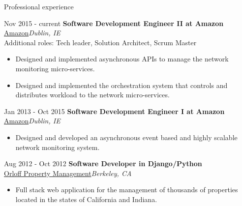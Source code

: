 \begin{cvlist}{Professional experience}
  \item[\footnotesize{Nov 2015 - current}] \textbf{Software Development Engineer II at Amazon}\\
  \href{http://www.amazon.com}{Amazon}\hfill\textit{Dublin, IE}\\
  Additional roles: Tech leader, Solution Architect, Scrum Master
  \begin{small}
    \begin{itemize}
      \item Designed and implemented asynchronous APIs to manage the network monitoring micro-services.
      \item Designed and implemented the orchestration system that controls and distributes workload to the network micro-services.
    \end{itemize}
  \end{small}
  \item[\footnotesize{Jan 2013 - Oct 2015}] \textbf{Software Development Engineer I at Amazon}\\
  \href{http://www.amazon.com}{Amazon}\hfill\textit{Dublin, IE}
  \begin{small}
    \begin{itemize}
      \item Designed and developed an asynchronous event based and highly scalable network monitoring system.
    \end{itemize}
  \end{small}
  \item[\footnotesize{Aug 2012 - Oct 2012}] \textbf{Software Developer in Django/Python}\\
  \href{http://opmservice.com}{Orloff Property Management}\hfill\textit{Berkeley, CA}
  \begin{small}
    \begin{itemize}
      \item Full stack web application for the management of
            thousands of properties located in the states
            of California and Indiana.\\


\end{itemize}
\end{small}
\end{cvlist}
